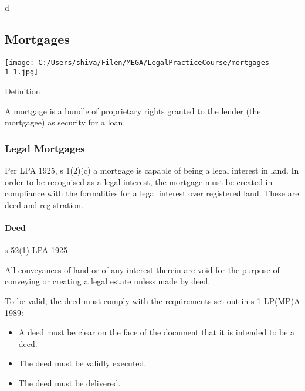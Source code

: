 \documentclass[
]{article}
\providecommand{\tightlist}{%
  \setlength{\itemsep}{0pt}\setlength{\parskip}{0pt}}
\newenvironment{env-9843ce55-0506-497d-95ba-03a690b05b3c}
{
    \savenotes\tcolorbox[blanker,breakable,left=5pt,borderline west={2pt}{-4pt}{green}]
}
{
    \endtcolorbox\spewnotes
}
\newenvironment{env-615494ee-4c11-425d-a24a-676608cc22a4}
{
    \savenotes\tcolorbox[blanker,breakable,left=5pt,borderline west={2pt}{-4pt}{gold}]
}
{
    \endtcolorbox\spewnotes
}
\begin{document}
d

\hypertarget{mortgages}{%
\subsection{Mortgages}\label{mortgages}}

\texttt{[image: C:/Users/shiva/Filen/MEGA/LegalPracticeCourse/mortgages 1\_1.jpg]}

\begin{env-615494ee-4c11-425d-a24a-676608cc22a4}

Definition

A mortgage is a bundle of proprietary rights granted to the lender (the
mortgagee) as security for a loan.

\end{env-615494ee-4c11-425d-a24a-676608cc22a4}

\hypertarget{legal-mortgages}{%
\subsubsection{Legal Mortgages}\label{legal-mortgages}}

Per LPA 1925, s 1(2)(c) a mortgage is capable of being a legal interest
in land. In order to be recognised as a legal interest, the mortgage
must be created in compliance with the formalities for a legal interest
over registered land. These are deed and registration.

\hypertarget{deed}{%
\paragraph{Deed}\label{deed}}

\begin{env-9843ce55-0506-497d-95ba-03a690b05b3c}

\href{https://www.legislation.gov.uk/ukpga/Geo5/15-16/20/section/52}{s
52(1) LPA 1925}

All conveyances of land or of any interest therein are void for the
purpose of conveying or creating a legal estate unless made by deed.

\end{env-9843ce55-0506-497d-95ba-03a690b05b3c}

To be valid, the deed must comply with the requirements set out in
\href{https://www.legislation.gov.uk/ukpga/1989/34/section/1}{s 1
LP(MP)A 1989}:

\begin{itemize}
\tightlist
\item
  A deed must be clear on the face of the document that it is intended
  to be a deed.
\item
  The deed must be validly executed.
\item
  The deed must be delivered.
\end{itemize}
\end{document}
